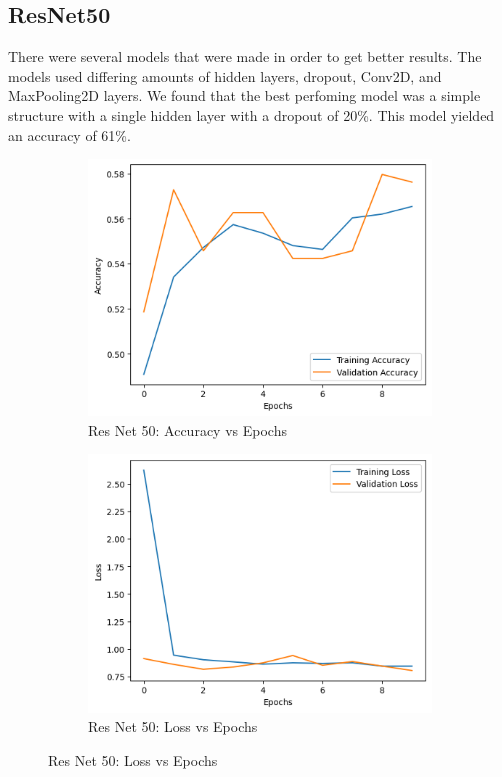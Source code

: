 \subsection{ResNet50}

There were several models that were made in order to get better results.
The models used differing amounts of hidden layers, dropout, Conv2D, and MaxPooling2D layers.
We found that the best perfoming model was a simple structure with a single hidden layer with a dropout of 20\%.
This model yielded an accuracy of 61\%.

\begin{figure}[h]
    \begin{subfigure}{0.4\textwidth}
        \centering
        \includegraphics[scale=0.5]{resnet50_acc}
        \caption{Res Net 50: Accuracy vs Epochs}
        \label{fig:figure3}
    \end{subfigure}
    \hspace{0.2\textwidth}
    \begin{subfigure}{0.4\textwidth}
        \centering
        \includegraphics[scale=0.5]{resnet50loss}
        \caption{Res Net 50: Loss vs Epochs}
        \label{fig:figure3}
    \end{subfigure}
\end{figure}

